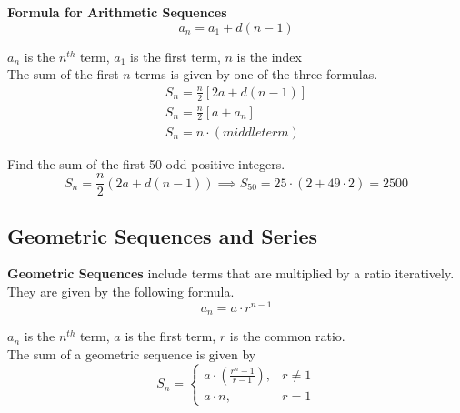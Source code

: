         \noindent \textbf{Formula for Arithmetic Sequences} \\

        \begin{equation*}
            a_n=a_1+d(n-1)
        \end{equation*}

        \noindent $a_n$ is the $n^{th}$ term, $a_1$ is the first term, $n$ is the index \\

        \noindent  The sum of the first $n$ terms is given by one of the three formulas. \\

        \begin{align*}
            S_n=\frac{n}{2}[2a+d(n-1)] \\
            S_n=\frac{n}{2}[a+a_n] \\
            S_n=n\cdot (middle term)
        \end{align*}

        \noindent Find the sum of the first 50 odd positive integers. \\

        \begin{equation*}
            S_n=\frac{n}{2}(2a+d(n-1))
            \implies
            S_{50}=25\cdot (2+49\cdot 2)=2500
        \end{equation*}



    \subsection{Geometric Sequences and Series}
        \textbf{Geometric Sequences} include terms that are multiplied by a ratio iteratively.
        They are given by the following formula. \\

        \begin{equation*}
            a_n=a\cdot r^{n-1}
        \end{equation*}

        \noindent $a_n$ is the $n^{th}$ term, $a$ is the first term, $r$ is the common ratio. \\

        \noindent The sum of a geometric sequence is given by \\

        \begin{equation*}
            S_n = \begin{cases}
                      a\cdot (\frac{r^n-1}{r-1}), & r\not=1 \\
                      a\cdot n, & r=1
            \end{cases}
        \end{equation*}

